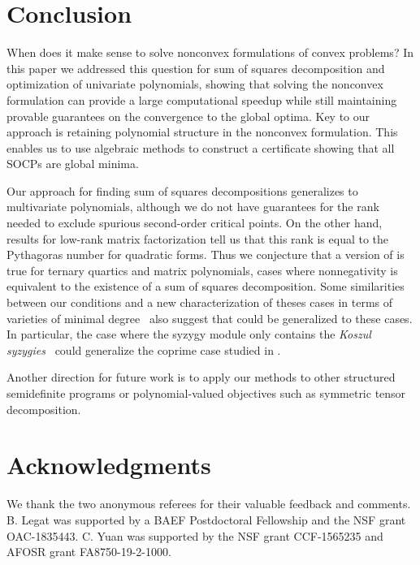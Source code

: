 \documentclass[final,onefignum,onetabnum]{siamart220329}
\begin{document}
\section{Conclusion}
When does it make sense to solve nonconvex formulations of convex problems? In
this paper we addressed this question for sum of squares decomposition and
optimization of univariate polynomials, showing that solving the nonconvex
formulation can provide a large computational speedup while still maintaining
provable guarantees on the convergence to the global optima. Key to our approach
is retaining polynomial structure in the nonconvex formulation. This enables us
to use algebraic methods to construct a certificate showing that all SOCPs are
global minima.

Our approach for finding sum of squares decompositions generalizes to
multivariate polynomials, although we do not have guarantees for the rank needed
to exclude spurious second-order critical points. On the other hand, results for
low-rank matrix factorization tell us that this rank is equal to the Pythagoras
number for quadratic forms. Thus we conjecture that a version of 
is true for ternary quartics and matrix polynomials, cases where nonnegativity
is equivalent to the existence of a sum of squares decomposition.  Some
similarities between our conditions and a new characterization of theses cases
in terms of varieties of minimal degree~\cite{blekherman2019low} also suggest
that  could be generalized to these cases.  In particular, the
case where the syzygy module only contains the \emph{Koszul
  syzygies}~\cite[p.~581]{cox2015groebner} could generalize the coprime case
studied in .

Another direction for future work is to apply our methods to other structured
semidefinite programs or polynomial-valued objectives such as symmetric tensor
decomposition.

\section{Acknowledgments}
We thank the two anonymous referees for their valuable feedback and comments.
B. Legat was supported by a BAEF Postdoctoral Fellowship and the NSF grant
OAC-1835443. C. Yuan was supported by the NSF grant CCF-1565235 and AFOSR grant
FA8750-19-2-1000.



\end{document}
